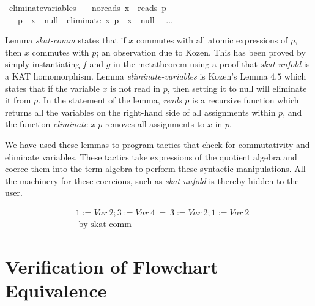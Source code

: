 \documentclass{llncs}
\begin{document}
\begin{isabellebody}
\isamarkupfalse%
\ eliminate{}variables{}\isanewline
\ \ \ no{}reads{}\ {}x\ {}\ reads\ p{}\isanewline
\ \ \ {}{}p{}\ {}\ x\ {}{}\ null\ {}\ {}eliminate\ x\ p{}\ {}\ x\ {}{}\ null{}\isanewline
\ \ $\dots$\isanewline
\end{isabellebody}

Lemma \textit{skat-comm} states that if $x$ commutes with all atomic
expressions of $p$, then $x$ commutes with $p$; an observation due to
Kozen. This has been proved by simply instantiating $f$ and $g$ in the
metatheorem using a proof that \textit{skat-unfold} is a KAT
homomorphism. Lemma \textit{eliminate-variables} is Kozen's Lemma
$4.5$ which states that if the variable $x$ is not read in $p$, then
setting it to null will eliminate it from $p$. In the statement of the
lemma, \textit{reads $p$} is a recursive function which returns all
the variables on the right-hand side of all assignments within $p$,
and the function \textit{eliminate x p} removes all assignments to $x$
in $p$.

We have used these lemmas to program tactics that check for
commutativity and eliminate variables. These tactics take expressions
of the quotient algebra and coerce them into the term algebra to
perform these syntactic manipulations. All the machinery for these
coercions, such as \textit{skat-unfold} is thereby hidden to the user.

\begin{align*} %
&1 := Var\ 2; 3 := Var\ 4\ =\ 3 := Var\ 2; 1 := Var\ 2\\
&\text{  by skat\_comm}
\end{align*}

\section{Verification of Flowchart Equivalence}
\end{document}
